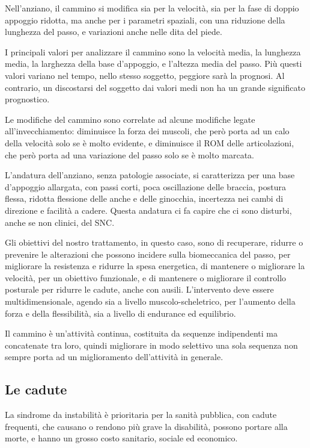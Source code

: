 Nell'anziano, il cammino si modifica sia per la velocità, sia per la fase di
doppio appoggio ridotta, ma anche per i parametri spaziali, con una riduzione
della lunghezza del passo, e variazioni anche nelle dita del piede.

I principali valori per analizzare il cammino sono la velocità media, la
lunghezza media, la larghezza della base d'appoggio, e l'altezza media del
passo. Più questi valori variano nel tempo, nello stesso soggetto, peggiore sarà
la prognosi. Al contrario, un discostarsi del soggetto dai valori medi non ha un
grande significato prognostico.

Le modifiche del cammino sono correlate ad alcune modifiche legate
all'invecchiamento: diminuisce la forza dei muscoli, che però porta ad un calo
della velocità solo se è molto evidente, e diminuisce il ROM delle
articolazioni, che però porta ad una variazione del passo solo se è molto
marcata.

L'andatura dell'anziano, senza patologie associate, si caratterizza per una base
d'appoggio allargata, con passi corti, poca oscillazione delle braccia, postura
flessa, ridotta flessione delle anche e delle ginocchia, incertezza nei cambi di
direzione e facilità a cadere. Questa andatura ci fa capire che ci sono
disturbi, anche se non clinici, del SNC.

Gli obiettivi del nostro trattamento, in questo caso, sono di recuperare,
ridurre o prevenire le alterazioni che possono incidere sulla biomeccanica del
passo, per migliorare la resistenza e ridurre la spesa energetica, di mantenere
o migliorare la velocità, per un obiettivo funzionale, e di mantenere o
migliorare il controllo posturale per ridurre le cadute, anche con ausili.
L'intervento deve essere multidimensionale, agendo sia a livello
muscolo-scheletrico, per l'aumento della forza e della flessibilità, sia a
livello di endurance ed equilibrio.

Il cammino è un'attività continua, costituita da sequenze indipendenti ma
concatenate tra loro, quindi migliorare in modo selettivo una sola sequenza non
sempre porta ad un miglioramento dell'attività in generale.

\subsection{Le cadute}
La sindrome da instabilità è prioritaria per la sanità pubblica, con cadute
frequenti, che causano o rendono più grave la disabilità, possono portare alla
morte, e hanno un grosso costo sanitario, sociale ed economico.

